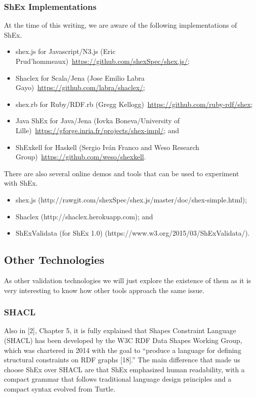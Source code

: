 \subsubsection{ShEx Implementations} 
At the time of this writing, we are aware of the following implementations of ShEx.

\begin{itemize}
	\item shex.js for Javascript/N3.js (Eric Prud’hommeaux) \url{https://github.com/shexSpec/shex.js/};
	\item Shaclex for Scala/Jena (Jose Emilio Labra Gayo) \url{https://github.com/labra/shaclex/};
	\item shex.rb for Ruby/RDF.rb (Gregg Kellogg) \url{https://github.com/ruby-rdf/shex};
	\item Java ShEx for Java/Jena (Iovka Boneva/University of Lille) \url{https://gforge.inria.fr/projects/shex-impl/}; and
	\item ShExkell for Haskell (Sergio Iván Franco and Weso Research Group) \url{https://github.com/weso/shexkell}.
\end{itemize}

There are also several online demos and tools that can be used to experiment with ShEx.

\begin{itemize}
	\item shex.js (http://rawgit.com/shexSpec/shex.js/master/doc/shex-simple.html);
	\item Shaclex (http://shaclex.herokuapp.com); and
	\item ShExValidata (for ShEx 1.0) (https://www.w3.org/2015/03/ShExValidata/).
\end{itemize}

\subsection{Other Technologies}
As other validation technologies we will just explore the existence of them as it is very interesting to know how other tools approach the same issue.

\subsubsection{SHACL}
Also in [2], Chapter 5, it is fully explained that Shapes Constraint Language (SHACL) has been developed by the W3C RDF Data Shapes Working Group, which was chartered in 2014 with the goal to “produce a language for defining structural constraints on RDF graphs [18].”
The main difference that made us choose ShEx over SHACL are that ShEx emphasized human readability, with a compact grammar that follows traditional language design principles and a compact syntax evolved from Turtle.

